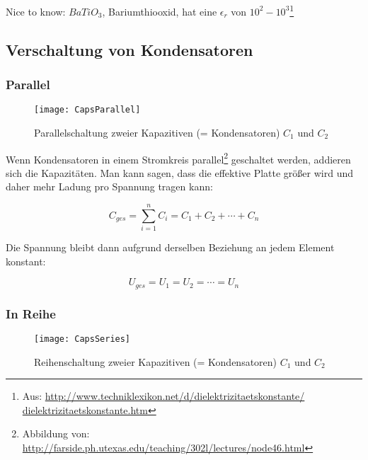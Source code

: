 \begin{leftbar}
Nice to know: $BaTiO_3$, Bariumthiooxid, hat eine $\epsilon_r$ von $10^2-10^3$\footnote{Aus: \href{http://www.techniklexikon.net/d/dielektrizitaetskonstante/dielektrizitaetskonstante.htm}{http://www.techniklexikon.net/d/dielektrizitaetskonstante/\\ dielektrizitaetskonstante.htm}}
\end{leftbar}


\subsection{Verschaltung von Kondensatoren}

\subsubsection{Parallel}

\begin{figure}[h!]
	\centering
	\texttt{[image: CapsParallel]}
	\caption{Parallelschaltung zweier Kapazitiven (= Kondensatoren) $C_1$ und $C_2$}
\end{figure}

Wenn Kondensatoren in einem Stromkreis parallel\footnote{Abbildung von: \url{http://farside.ph.utexas.edu/teaching/302l/lectures/node46.html}} geschaltet werden, addieren sich die Kapazitäten. Man kann sagen, dass die effektive Platte größer wird und daher mehr Ladung pro Spannung tragen kann:

\begin{equation}
	C_{ges} = \sum\limits_{i=1}^n C_i = C_1 + C_2 + \cdots + C_n
\end{equation}

\noindent Die Spannung bleibt dann aufgrund derselben Beziehung an jedem Element konstant:

\begin{equation}
	U_{ges} = U_1 = U_2 = \cdots = U_n
\end{equation}


\subsubsection{In Reihe}

\begin{figure}[h!]
	\centering
	\texttt{[image: CapsSeries]}
	\caption{Reihenschaltung zweier Kapazitiven (= Kondensatoren) $C_1$ und $C_2$}
\end{figure}

